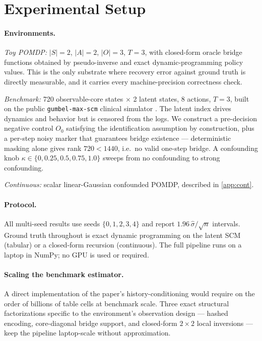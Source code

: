 \section{Experimental Setup}
\label{app:setup}

\paragraph{Environments.}
\emph{Toy POMDP:} $|S|{=}2$, $|A|{=}2$, $|O|{=}3$, $T{=}3$, with closed-form
oracle bridge functions obtained by pseudo-inverse and exact dynamic-programming
policy values. This is the only substrate where recovery error against ground
truth is directly measurable, and it carries every machine-precision correctness
check.

\emph{Benchmark:} 720 observable-core states $\times$ 2 latent states, 8 actions,
$T{=}3$, built on the public \texttt{gumbel-max-scm} clinical simulator
\citep{oberst2019}. The latent index drives dynamics and behavior but is censored
from the logs. We construct a pre-decision negative control $O_0$ satisfying the
identification assumption by construction, plus a per-step noisy marker that
guarantees bridge existence --- deterministic masking alone gives rank
$720 < 1440$, i.e.\ no valid one-step bridge. A confounding knob
$\kappa \in \{0, 0.25, 0.5, 0.75, 1.0\}$ sweeps from no confounding to strong
confounding.

\emph{Continuous:} scalar linear-Gaussian confounded POMDP, described in
\cref{app:cont}.

\paragraph{Protocol.} All multi-seed results use seeds $\{0,1,2,3,4\}$ and report
$1.96\,\hat\sigma/\sqrt{n}$ intervals. Ground truth throughout is exact dynamic
programming on the latent SCM (tabular) or a closed-form recursion (continuous).
The full pipeline runs on a laptop in NumPy; no GPU is used or required.

\paragraph{Scaling the benchmark estimator.} A direct implementation of the
paper's history-conditioning would require on the order of billions of table
cells at benchmark scale. Three exact structural factorizations specific to the
environment's observation design --- hashed encoding, core-diagonal bridge
support, and closed-form $2\times2$ local inversions --- keep the pipeline
laptop-scale without approximation.

